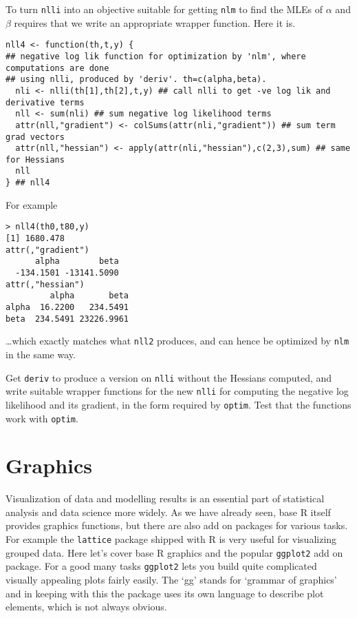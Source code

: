 \documentclass[10pt] {article}
\theoremstyle{definition}
\begin{document}
To turn {\tt nlli} into an objective suitable for getting {\tt nlm} to find the MLEs of $\alpha $ and $\beta$ requires that we write an appropriate wrapper function. Here it is.
\begin{lstlisting}
nll4 <- function(th,t,y) {
## negative log lik function for optimization by 'nlm', where computations are done
## using nlli, produced by 'deriv'. th=c(alpha,beta).
  nli <- nlli(th[1],th[2],t,y) ## call nlli to get -ve log lik and derivative terms
  nll <- sum(nli) ## sum negative log likelihood terms
  attr(nll,"gradient") <- colSums(attr(nli,"gradient")) ## sum term grad vectors
  attr(nll,"hessian") <- apply(attr(nli,"hessian"),c(2,3),sum) ## same for Hessians 
  nll
} ## nll4  
\end{lstlisting}
For example
\begin{lstlisting}
> nll4(th0,t80,y)
[1] 1680.478
attr(,"gradient")
      alpha        beta 
  -134.1501 -13141.5090 
attr(,"hessian")
         alpha       beta
alpha  16.2200   234.5491
beta  234.5491 23226.9961
\end{lstlisting}
\ldots which exactly matches what {\tt nll2} produces, and can hence be optimized by {\tt nlm} in the same way. 

\bigskip

 Get {\tt deriv} to produce a version on {\tt nlli} without the Hessians computed, and write suitable wrapper functions for the new {\tt nlli} for computing the negative log likelihood and its gradient, in the form required by {\tt optim}. Test that the functions work with {\tt optim}.   


\section{Graphics}

Visualization of data and modelling results is an essential part of statistical analysis and data science more widely. As we have already seen, base R itself provides graphics functions, but there are also add on packages for various tasks. For example the {\tt lattice} package shipped with R is very useful for visualizing grouped data. Here let's cover base R graphics and the popular {\tt ggplot2} add on package. For a good many tasks {\tt ggplot2} lets you build quite complicated visually appealing plots fairly easily. The `gg' stands for `grammar of graphics' and in keeping with this the package uses its own language to describe plot elements, which is not always obvious. 
\end{document}
